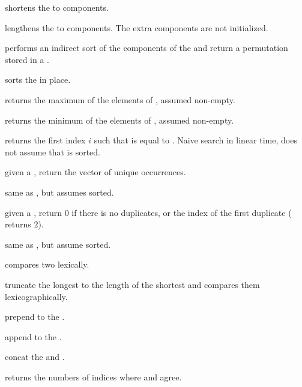  shortens the  
to  components.

 lengthens the 
 to  components. The extra components are not initialized.

 performs an indirect sort of the
components of the   and return a permutation stored in a
.

 sorts the   in place.

 returns the maximum of the elements of
 , assumed non-empty.

 returns the minimum of the elements of
 , assumed non-empty.

 returns the first index $i$
such that  is equal to . Naive search in linear time, does
not assume that  is sorted.

 given a  , return
the vector of unique occurrences.

 same as , but assumes
  sorted.

 given a  , return
$0$ if there is no duplicates, or the index of the first duplicate
( returns $2$).

 same as
, but assume  sorted.

 compares two  lexically.

 truncate the longest 
to the length of the shortest and compares them lexicographically.

 prepend  to the  .

 append  to the  .

 concat the   and .

 returns the numbers of indices where  and  agree.

